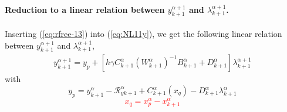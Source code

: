 \paragraph{Reduction to a linear relation between  $y^{\alpha+1}_{k+1}$ and
$\lambda^{\alpha+1}_{k+1}$.}

Inserting (\ref{eq:rfree-13}) into (\ref{eq:NL11y}), we get the following linear relation between $y^{\alpha+1}_{k+1}$ and $\lambda^{\alpha+1}_{k+1}$, 
\begin{equation}
   \begin{array}{l}
     y^{\alpha+1}_{k+1} = y_p + \left[ h \gamma C^{\alpha}_{k+1} ( W^{\alpha}_{k+1})^{-1}  B^{\alpha}_{k+1} + D^{\alpha}_{k+1} \right]\lambda^{\alpha+1}_{k+1}
   \end{array}
\end{equation}
with 
\begin{equation}\boxed{
    y_p = y^{\alpha}_{k+1} -\mathcal R^{\alpha}_{yk+1} + C^{\alpha}_{k+1}(x_q) -   D^{\alpha}_{k+1} \lambda^{\alpha}_{k+1} }
\end{equation}
\textcolor{red}{
  \begin{equation}
   \boxed{ x_q=x^\alpha_p -x^{\alpha}_{k+1}\label{eq:xqq}}
  \end{equation}
}











